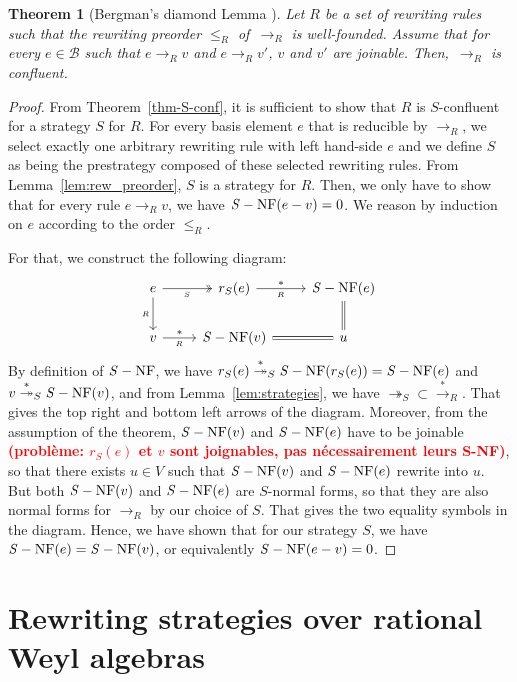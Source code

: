 \documentclass[11pt]{article}
\newtheorem{theorem}{Theorem}[section]
\theoremstyle{definition}
\newcommand\todo[1]{{\bf\textcolor{red}{#1}}}
\newcommand\basis{\mathscr{B}}
\newcommand\ordR{\leq_R}
\newcommand\rewR{\to_R}
\newcommand\parS{\twoheadrightarrow_S}
\newcommand\transR{\overset{*}{\to}_R}
\newcommand\transS{\overset{*}{\twoheadrightarrow}_S}
\DeclareMathOperator{\SNF}{{\it S}-NF}
\begin{document}
\begin{theorem}[Bergman's diamond Lemma \cite{MR506890}]\label{thm:diamond_lemma}
  Let $R$ be a set of rewriting rules such that the rewriting preorder
  $\ordR$ of~$\rewR$ is well-founded. Assume that  for every $e\in\basis$
  such that $e\rewR v$ and $e\rewR v'$, $v$ and $v'$ are joinable. 
  Then,~$\rewR$ is confluent.
\end{theorem}

\begin{proof}
  From Theorem~\ref{thm-S-conf}, it is sufficient to show that $R$ is
  $S$-confluent for a strategy $S$ for $R$. For every basis element $e$ that is
  reducible by $\rewR$, we select exactly one arbitrary rewriting rule with left
  hand-side $e$ and we define $S$ as being the prestrategy composed of these
  selected rewriting rules. From Lemma~\ref{lem:rew_preorder}, $S$ is a strategy
  for $R$. Then, we only have to show that for every rule $e\rewR v$, we have
  $\SNF(e-v)=0$. We reason by induction on $e$ according to the order $\ordR$.

  

 For that, we construct the
  following diagram:
  \[\begin{tikzcd}
  e\ar[d, "_R"']\ar[r, twoheadrightarrow, "_S"'] & 
  r_S(e)\ar[r, "*", "_R"'] & \SNF(e)\ar[d, equal]\\
  v\ar[r, "*", "_R"'] & \SNF(v)\ar[r, equal] & u
\end{tikzcd}\] By definition of $\SNF$, we have
$r_S(e)\transS\SNF(r_S(e))=\SNF(e)$ and $v\transS\SNF(v)$, and from
Lemma~\ref{lem:strategies}, we have $\parS\subset\transR$. That gives the top right
and bottom left arrows of the diagram. Moreover, from the assumption of the
theorem, $\SNF(v)$ and $\SNF(e)$ have to be joinable \todo{(probl\`eme: $r_S(e)$
  et $v$ sont joignables, pas nécessairement leurs S-NF)}, so that there exists
$u\in V$ such that $\SNF(v)$ and $\SNF(e)$ rewrite into $u$. But both $\SNF(v)$
and $\SNF(e)$ are $S$-normal forms, so that they are also normal forms for
$\rewR$ by our choice of $S$. That gives the two equality symbols in the
diagram. Hence, we have shown that for our strategy $S$, we have
$\SNF(e)=\SNF(v)$, or equivalently $\SNF(e-v)=0$.
\end{proof}

\section{Rewriting strategies over rational Weyl algebras}
\label{sec:rewriting_strategies_over_rational_Weyl_algebras}
\end{document}
